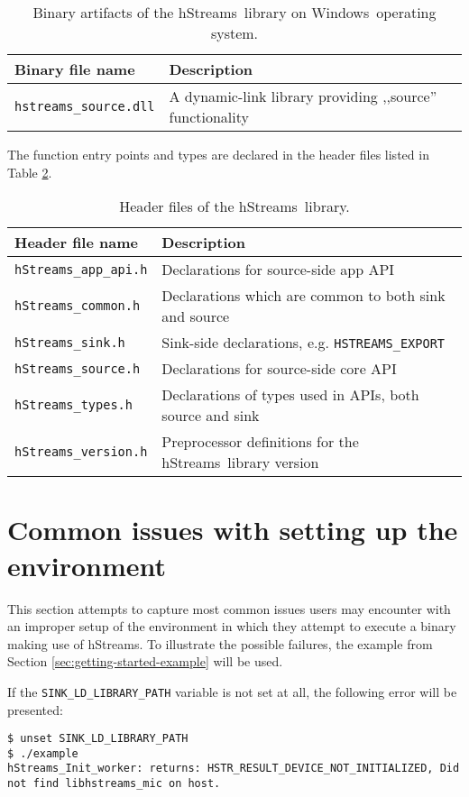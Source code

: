 \documentclass[a4,oneside]{book}
\newcommand{\hstreams}{hStreams}
\newcommand{\windows}{Windows}
\begin{document}
\begin{table}[h]
\begin{tabularx}{\textwidth}{ l X }\hline
  Binary file name & Description \\ \hline
  \texttt{hstreams\_source.dll} & A dynamic-link library providing ,,source'' functionality \\ \hline
\end{tabularx}
\caption{Binary artifacts of the \hstreams\ library on \windows\ operating system.}
\label{tab:hstreams-binaries-windows}
\end{table}

The function entry points and types are declared in the header files listed in Table \ref{tab:hstreams-headers}.
\begin{table}[h]
\begin{tabularx}{\textwidth}{ l X }\hline
  Header file name & Description \\ \hline
  \texttt{hStreams\_app\_api.h} & Declarations for source-side app API \\ \hline
  \texttt{hStreams\_common.h} & Declarations which are common to both sink and source \\ \hline
  \texttt{hStreams\_sink.h} & Sink-side declarations, e.g. \texttt{HSTREAMS\_EXPORT} \\ \hline
  \texttt{hStreams\_source.h} & Declarations for source-side core API \\ \hline
  \texttt{hStreams\_types.h} & Declarations of types used in APIs, both source and sink \\ \hline
  \texttt{hStreams\_version.h} & Preprocessor definitions for the \hstreams\ library version \\ \hline
\end{tabularx}
\caption{Header files of the \hstreams\ library.}
\label{tab:hstreams-headers}
\end{table}

\section{Common issues with setting up the environment}
This section attempts to capture most common issues users may encounter with an improper setup of the environment in which they attempt to execute a binary making use of \hstreams.
To illustrate the possible failures, the example from Section \ref{sec:getting-started-example} will be used.

If the \texttt{SINK\_LD\_LIBRARY\_PATH} variable is not set at all, the following error will be presented:
\begin{lstlisting}[style=BashCmdListingStyle,caption={Running the example without \texttt{SINK\_LD\_LIBRARY\_PATH}},frame=tlrb,label={lst:example-nosinkld}]
$ unset SINK_LD_LIBRARY_PATH
$ ./example
hStreams_Init_worker: returns: HSTR_RESULT_DEVICE_NOT_INITIALIZED, Did not find libhstreams_mic on host.
\end{lstlisting}
\end{document}
